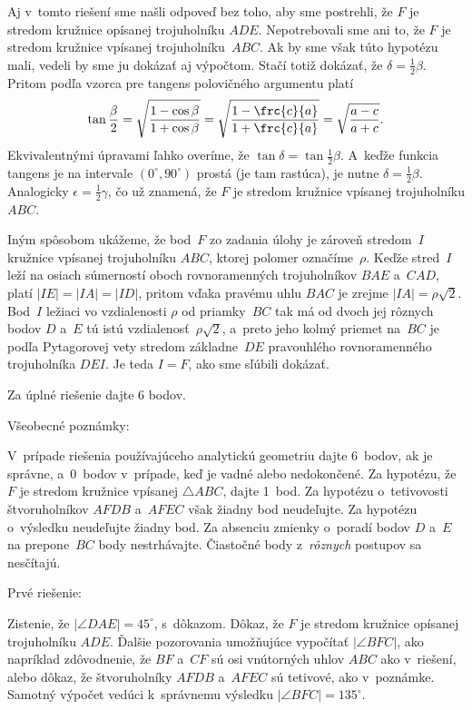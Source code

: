 {\poznamka
Aj v~tomto riešení sme našli odpoveď bez toho, aby sme
postrehli, že $F$ je stredom kružnice opísanej trojuholníku $ADE$. Nepotrebovali sme ani
to, že $F$ je stredom kružnice vpísanej trojuholníku~$ABC$. Ak by sme
však túto hypotézu mali, vedeli by sme ju dokázať aj výpočtom. Stačí
totiž dokázať, že $\delta = \frac12\beta$. Pritom podľa vzorca pre tangens
polovičného argumentu platí
$$
\tan \frac \beta2 = \sqrt {\frac {1- \cos \beta} {1+ \cos\beta}}
= \sqrt {\frac {1- \frc {c}{a}} {1+ \frc {c}{a}}} = \sqrt {\frac {a-c}{a+c}}.
$$
Ekvivalentnými úpravami ľahko overíme, že $\tan \delta = \tan \frac12\beta$.
A~keďže funkcia tangens je na intervale $(0^\circ, 90^\circ)$ prostá
(je tam rastúca), je nutne $\delta = \frac12\beta$. Analogicky
$\epsilon = \frac12\gamma$, čo už znamená, že $F$ je stredom kružnice
vpísanej trojuholníku $ABC$.

\ineres
Iným spôsobom ukážeme, že bod~$F$ zo zadania úlohy je zároveň
stredom~$I$ kružnice vpísanej trojuholníku $ABC$, ktorej polomer
označíme~$\rho$. Keďže stred~$I$ leží na osiach súmerností
oboch rovnoramenných trojuholníkov $BAE$ a~$CAD$, platí $|IE|=|IA|=|ID|$,
pritom vďaka pravému uhlu $BAC$ je zrejme $|IA|=\rho\sqrt2$. Bod~$I$
ležiaci vo vzdialenosti $\rho$ od priamky~$BC$ tak má od dvoch jej
rôznych bodov $D$ a~$E$ tú istú vzdialenosť~$\rho\sqrt2$, a~preto jeho
kolmý priemet na~$BC$ je podľa Pytagorovej vety stredom základne~$DE$ pravouhlého rovnoramenného trojuholníka $DEI$. Je teda $I=F$, ako
sme sľúbili dokázať.

\nobreak\medskip
\petit
\BeginSchema

Za úplné riešenie dajte 6 bodov.

\Podnadpis Všeobecné poznámky:

\Item V~prípade riešenia používajúceho analytickú geometriu
dajte 6~bodov, ak je správne, a~0~bodov v~prípade, keď je vadné alebo
nedokončené.
\Item Za hypotézu, že $F$ je stredom kružnice vpísanej $\triangle ABC$, dajte 1~bod.
\Item Za hypotézu o~tetivovosti štvoruholníkov $AFDB$ a~$AFEC$ však žiadny bod neudeľujte.
\Item Za hypotézu o~výsledku neudeľujte žiadny bod.
\Item Za absenciu zmienky o~poradí bodov $D$ a~$E$ na prepone~$BC$ body nestrhávajte.
\Item Čiastočné body z~{\it rôznych\/} postupov sa nesčítajú.

\Podnadpis Prvé riešenie:

 Zistenie, že $|\angle DAE| = 45^\circ$, s~dôkazom.
 Dôkaz, že $F$ je stredom kružnice opísanej trojuholníku $ADE$.
 Ďalšie pozorovania umožňujúce vypočítať $|\angle BFC|$, ako napríklad zdôvodnenie,
že $BF$ a~$CF$ sú osi vnútorných uhlov $ABC$ ako v~riešení, alebo dôkaz,
že štvoruholníky $AFDB$ a~$AFEC$ sú tetivové, ako v~poznámke.
 Samotný výpočet vedúci k~správnemu výsledku $|\angle BFC| = 135^\circ$.

}
